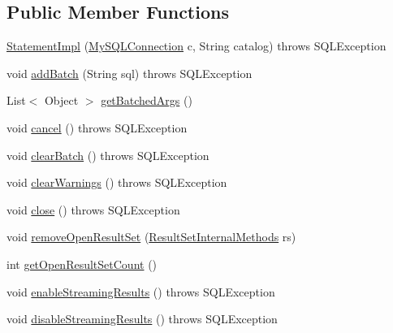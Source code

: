 \subsection*{Public Member Functions}
\begin{DoxyCompactItemize}
\item 
\mbox{\hyperlink{classcom_1_1mysql_1_1jdbc_1_1_statement_impl_a2d3783c9f776e2eb863b449b21825b4d}{Statement\+Impl}} (\mbox{\hyperlink{interfacecom_1_1mysql_1_1jdbc_1_1_my_s_q_l_connection}{My\+S\+Q\+L\+Connection}} c, String catalog)  throws S\+Q\+L\+Exception 
\item 
void \mbox{\hyperlink{classcom_1_1mysql_1_1jdbc_1_1_statement_impl_a3ea3c4f24a3d1c9d4f9f9a9d29e53a02}{add\+Batch}} (String sql)  throws S\+Q\+L\+Exception 
\item 
List$<$ Object $>$ \mbox{\hyperlink{classcom_1_1mysql_1_1jdbc_1_1_statement_impl_a499ced5209fbe33c253203ee964216b0}{get\+Batched\+Args}} ()
\item 
void \mbox{\hyperlink{classcom_1_1mysql_1_1jdbc_1_1_statement_impl_acbb72ce19a291352b21e798031bef18d}{cancel}} ()  throws S\+Q\+L\+Exception 
\item 
void \mbox{\hyperlink{classcom_1_1mysql_1_1jdbc_1_1_statement_impl_adfc1b8c91ff6752b061d02293fc4dd78}{clear\+Batch}} ()  throws S\+Q\+L\+Exception 
\item 
void \mbox{\hyperlink{classcom_1_1mysql_1_1jdbc_1_1_statement_impl_a3c483be7df71683de12dd730bd90059e}{clear\+Warnings}} ()  throws S\+Q\+L\+Exception 
\item 
void \mbox{\hyperlink{classcom_1_1mysql_1_1jdbc_1_1_statement_impl_a740a220f82b06eace44154a089fbdf18}{close}} ()  throws S\+Q\+L\+Exception 
\item 
void \mbox{\hyperlink{classcom_1_1mysql_1_1jdbc_1_1_statement_impl_ab4429663e878a0b4b52445a95761b37d}{remove\+Open\+Result\+Set}} (\mbox{\hyperlink{interfacecom_1_1mysql_1_1jdbc_1_1_result_set_internal_methods}{Result\+Set\+Internal\+Methods}} rs)
\item 
int \mbox{\hyperlink{classcom_1_1mysql_1_1jdbc_1_1_statement_impl_ab14de7277504c8cd025b3af5a367beba}{get\+Open\+Result\+Set\+Count}} ()
\item 
void \mbox{\hyperlink{classcom_1_1mysql_1_1jdbc_1_1_statement_impl_aebd63b45b20e164efe403d4c1d5bebc9}{enable\+Streaming\+Results}} ()  throws S\+Q\+L\+Exception 
\item 
void \mbox{\hyperlink{classcom_1_1mysql_1_1jdbc_1_1_statement_impl_a1189cc8b7b69c3abdcee0cedb03298f5}{disable\+Streaming\+Results}} ()  throws S\+Q\+L\+Exception 

\end{DoxyCompactItemize}
